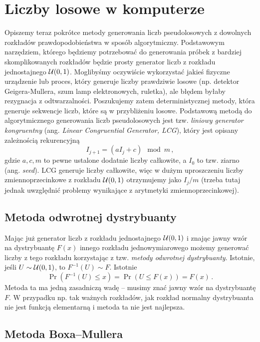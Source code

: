 \documentclass{myclass}
\begin{document}
\section{Liczby losowe w komputerze}

Opiszemy teraz pokrótce metody generowania liczb pseudolosowych z dowolnych rozkładów
prawdopodobieństwa w sposób algorytmiczny. Podstawowym narzędziem, którego będziemy potrzebować do
generowania próbek z bardziej skomplikowanych rozkładów będzie prosty generator liczb z rozkładu
jednostajnego \(\mathcal{U}(0,1)\). Moglibyśmy oczywiście wykorzystać jakieś fizyczne urządzenie lub
proces, który generuje liczby prawdziwie losowe (np. detektor Geigera-Mullera, szum lamp
elektronowych, ruletka), ale błędem byłaby rezygnacja z odtwarzalności. Poszukujemy zatem
deterministycznej metody, która generuje sekwencje liczb, które są w przybliżeniu losowe. Podstawową
metodą do algorytmicznego generowania liczb pseudolosowych jest tzw. \emph{liniowy generator
kongruentny} (ang. \emph{Linear Congruential Generator, LCG}), który jest opisany zależnością
rekurencyjną
\[
I_{j+1} = (a I_j + c) \mod m\,,
\]
gdzie \(a, c, m\) to pewne ustalone dodatnie liczby całkowite, a \(I_0\) to tzw. ziarno (ang.
\emph{seed}). LCG generuje liczby całkowite, więc w dużym uproszczeniu liczby zmiennoprzecinkowe z
rozkładu \(\mathcal{U}(0,1)\) otrzymujemy jako \(I_j / m\) (trzeba tutaj jednak uwzględnić problemy
wynikające z arytmetyki zmiennoprzecinkowej).

\subsection{Metoda odwrotnej dystrybuanty}

Mając już generator liczb z rozkładu jednostajnego \(\mathcal{U}(0,1)\) i znając jawny wzór na
dystrybuantę \(F(x)\) innego rozkładu jednowymiarowego możemy generować liczby z tego rozkładu
korzystając z tzw. \emph{metody odwrotnej dystrybuanty}. Istotnie, jeśli \(U \sim \mathcal{U}(0,1)\), to
\(F^{-1}(U) \sim F\). Istotnie
\[
\Pr(F^{-1}(U) \leq x) = \Pr(U \leq F(x)) = F(x)\,.
\]
Metoda ta ma jedną zasadniczą wadę -- musimy znać jawny wzór na dystrybuantę \(F\). W przypadku np.
tak ważnych rozkładów, jak rozkład normalny dystrybuanta nie jest funkcją elementarną i metoda ta
nie jest najlepsza.

\subsection{Metoda Boxa--Mullera}
\end{document}
